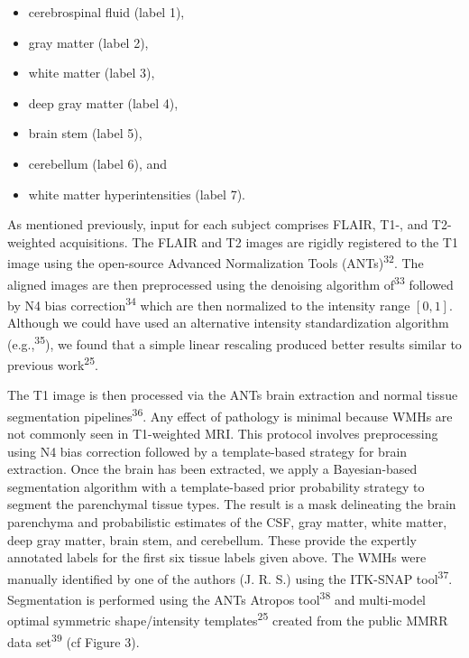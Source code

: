\documentclass[11pt,]{article}
\providecommand{\tightlist}{%
  \setlength{\itemsep}{0pt}\setlength{\parskip}{0pt}}
\begin{document}
\begin{itemize}
\tightlist
\item
  cerebrospinal fluid (label 1),
\item
  gray matter (label 2),
\item
  white matter (label 3),
\item
  deep gray matter (label 4),
\item
  brain stem (label 5),
\item
  cerebellum (label 6), and
\item
  white matter hyperintensities (label 7).
\end{itemize}

As mentioned previously, input for each subject comprises FLAIR, T1-,
and T2-weighted acquisitions. The FLAIR and T2 images are rigidly
registered to the T1 image using the open-source Advanced Normalization
Tools (ANTs)\textsuperscript{32}. The aligned images are then
preprocessed using the denoising algorithm of\textsuperscript{33}
followed by N4 bias correction\textsuperscript{34} which are then
normalized to the intensity range \([0,1]\). Although we could have used
an alternative intensity standardization algorithm
(e.g.,\textsuperscript{35}), we found that a simple linear rescaling
produced better results similar to previous work\textsuperscript{25}.

The T1 image is then processed via the ANTs brain extraction and normal
tissue segmentation pipelines\textsuperscript{36}. Any effect of
pathology is minimal because WMHs are not commonly seen in T1-weighted
MRI. This protocol involves preprocessing using N4 bias correction
followed by a template-based strategy for brain extraction. Once the
brain has been extracted, we apply a Bayesian-based segmentation
algorithm with a template-based prior probability strategy to segment
the parenchymal tissue types. The result is a mask delineating the brain
parenchyma and probabilistic estimates of the CSF, gray matter, white
matter, deep gray matter, brain stem, and cerebellum. These provide the
expertly annotated labels for the first six tissue labels given above.
The WMHs were manually identified by one of the authors (J. R. S.) using
the ITK-SNAP tool\textsuperscript{37}. Segmentation is performed using
the ANTs Atropos tool\textsuperscript{38} and multi-model optimal
symmetric shape/intensity templates\textsuperscript{25} created from the
public MMRR data set\textsuperscript{39} (cf Figure 3).
\end{document}
